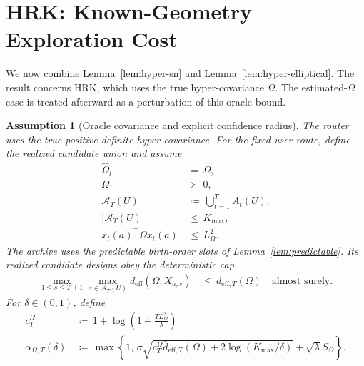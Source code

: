 \documentclass{article} %
\newtheorem{assumption}{Assumption}
\begin{document}
\section{HRK: Known-Geometry Exploration Cost}
\label{sec:theory-oracle-hyper}

We now combine Lemma~\ref{lem:hyper-sn} and Lemma~\ref{lem:hyper-elliptical}. The result concerns HRK, which uses the true hyper-covariance \(\Omega\). The estimated-\(\Omega\) case is treated afterward as a perturbation of this oracle bound.

\begin{assumption}[Oracle covariance and explicit confidence radius]
\label{ass:hyper-oracle-calibrated}
The router uses the true positive-definite hyper-covariance. For the fixed-user
route, define the realized candidate union and assume
\begin{align}
\widehat{\Omega}_t
&\,=\,
\Omega,
\label{eq:hyper-oracle-omega-known}
\\
\Omega
&\,\succ\,
0,
\label{eq:hyper-oracle-omega-pd}
\\
\mathcal A_T(U)
&\,\coloneqq\,
\bigcup_{t=1}^{T}A_t(U).
\label{eq:hyper-oracle-union}
\\
|\mathcal A_T(U)|
&\,\leq\,
K_{\max},
\label{eq:hyper-oracle-kmax}
\\
x_t(a)^\top\Omega x_t(a)
&\,\leq\,
L_{\Omega}^{2}.
\label{eq:hyper-oracle-feature-bound}
\end{align}
The archive uses the predictable birth-order slots of
Lemma~\ref{lem:predictable}. Its realized candidate designs obey the
deterministic cap
\begin{equation}
\label{eq:hyper-oracle-deff-cap}
\begin{aligned}
\max_{1\le s\le T+1}\max_{a\in\mathcal A_T(U)}
d_{\mathrm{eff}}(\Omega;X_{a,s})
&\,\leq\,
\bar d_{\mathrm{eff},T}(\Omega)
\quad\text{almost surely}.
\end{aligned}
\end{equation}
For \(\delta\in(0,1)\), define
\begin{align}
c_T^\Omega
&\,\coloneqq\,
1+\log\!\left(1+\frac{TL_\Omega^2}{\lambda}\right)
\label{eq:hyper-oracle-cT}
\\
\alpha_{\Omega,T}(\delta)
&\,\coloneqq\,
\max\!\left\{
1,\,
\sigma\sqrt{
c_T^\Omega\bar d_{\mathrm{eff},T}(\Omega)
+2\log(K_{\max}/\delta)}
+\sqrt{\lambda}S_\Omega
\right\}.
\label{eq:hyper-oracle-alpha}
\end{align}
\end{assumption}
\end{document}

